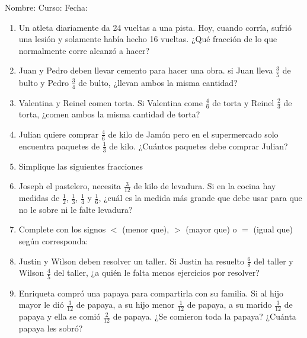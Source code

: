 \documentclass[letterpaper,fleqn]{article}
\newcommand{\LineaNombre}{%
\par
\vspace{\baselineskip}
Nombre:\hrulefill \; Curso: \underline{\hspace*{48pt}} \; Fecha: \underline{\hspace*{2.5cm}} \relax
\par}
\begin{document}
\LineaNombre
\begin{enumerate}
 \item Un atleta diariamente da 24 vueltas a una pista. Hoy, cuando corría, sufrió una lesión y solamente había hecho 16 vueltas. ¿Qué  fracción de lo que normalmente corre alcanzó a hacer? \noanswer
\item Juan y Pedro deben llevar cemento para hacer una obra. si Juan lleva $\frac{3}{5}$ de bulto y Pedro $\frac{3}{4}$ de bulto, ¿llevan ambos la misma cantidad?\noanswer
\item Valentina y Reinel comen torta. Si Valentina come $\frac{4}{6}$ de torta y Reinel $\frac{2}{3}$ de torta, ¿comen ambos la misma cantidad de torta?\noanswer
\item Julian quiere comprar $\frac{4}{6}$ de kilo de Jamón pero en el supermercado solo encuentra  paquetes de $\frac{1}{3}$ de kilo. ¿Cuántos paquetes debe comprar Julian?\noanswer
\newpage
\item Simplique las siguientes fracciones
\begin{enumerate}
\end{enumerate}
\item Joseph el pastelero, necesita $\frac{3}{12}$ de kilo de levadura. Si en la cocina hay medidas de $\frac{1}{2}$, $\frac{1}{3}$, $\frac{1}{4}$ y $\frac{1}{6}$, ¿cu\'{a}l es la medida m\'{a}s grande que debe usar para que no le sobre ni le falte levadura?\noanswer
\item Complete con los signos $<$ (menor que), $>$ (mayor que) o $=$ (igual que) según corresponda:
\begin{enumerate}
\end{enumerate}
\item Justin y Wilson deben resolver un taller. Si Justin ha resuelto $\frac{6}{8}$ del taller y Wilson $\frac{4}{5}$ del taller, ¿a quién le falta menos ejercicios por resolver?\noanswer
\item Enriqueta compró una papaya para compartirla con su familia. Si al hijo mayor le dió $\frac{3}{12} $ de papaya, a su hijo menor $\frac{1}{12}$ de papaya, a su marido $\frac{3}{12}$ de papaya y ella se comió $\frac{2}{12}$ de papaya. ¿Se comieron toda la papaya? ¿Cuánta papaya les sobró?\noanswer
 \end{enumerate}
\end{document}
